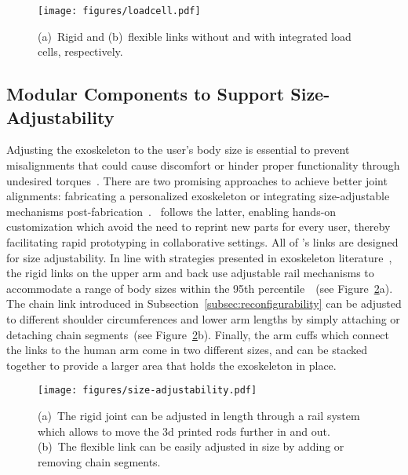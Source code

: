 \begin{figure}[tb]
    \centering
    \texttt{[image: figures/loadcell.pdf]}
    \caption{(a)~Rigid and (b)~flexible links without and with integrated load cells, respectively.}
    \label{fig:loadcell}
\end{figure}


\subsection{Modular Components to Support Size-Adjustability}
Adjusting the exoskeleton to the user's body size is essential to prevent misalignments that could cause discomfort or hinder proper functionality through undesired torques~\cite{gull_2020}. There are two promising approaches to achieve better joint alignments: fabricating a personalized exoskeleton or integrating size-adjustable mechanisms post-fabrication~\cite{sarac_2019}. \toolkit~follows the latter, enabling hands-on customization which avoid the need to reprint new parts for every user, thereby facilitating rapid prototyping in collaborative settings. All of \toolkit's links are designed for size adjustability. In line with strategies presented in exoskeleton literature~\cite{bartenbach_2016,zhang_2023}, the rigid links on the upper arm and back use adjustable rail mechanisms to accommodate a range of body sizes within the 95th percentile~\cite{gordon_1988}~(see Figure~\ref{fig:size-adjustability}a). The chain link introduced in Subsection~\ref{subsec:reconfigurability} can be adjusted to different shoulder circumferences and lower arm lengths by simply attaching or detaching chain segments~(see Figure~\ref{fig:size-adjustability}b). Finally, the arm cuffs which connect the links to the human arm come in two different sizes, and can be stacked together to provide a larger area that holds the exoskeleton in place.

\begin{figure}[tb]
    \centering
    \texttt{[image: figures/size-adjustability.pdf]}
    \caption{(a)~The rigid joint can be adjusted in length through a rail system which allows to move the 3d printed rods further in and out. (b)~The flexible link can be easily adjusted in size by adding or removing chain segments.}%
    \label{fig:size-adjustability}
\end{figure}

